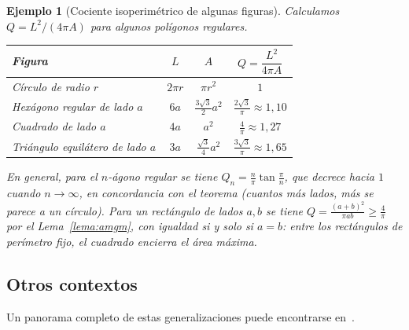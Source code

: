 \documentclass[12pt,a4paper]{article}
\theoremstyle{profesional}
\theoremstyle{definicion-style}
\newtheorem{ejemplo}[teorema]{Ejemplo}
\begin{document}
\begin{ejemplo}[Cociente isoperimétrico de algunas figuras]
    Calculamos \( Q = L^2/(4\pi A) \) para algunos polígonos regulares.
    \begin{center}
        \renewcommand{\arraystretch}{1.5}
        \begin{tabular}{lccc}
            \toprule
            Figura                               & \( L \)      & \( A \)                       & \( Q = \dfrac{L^2}{4\pi A} \)              \\
            \midrule
            Círculo de radio \( r \)             & \( 2\pi r \) & \( \pi r^2 \)                 & \( 1 \)                                    \\
            Hexágono regular de lado \( a \)     & \( 6a \)     & \( \frac{3\sqrt{3}}{2} a^2 \) & \( \frac{2\sqrt{3}}{\pi} \approx 1{,}10 \) \\
            Cuadrado de lado \( a \)             & \( 4a \)     & \( a^2 \)                     & \( \frac{4}{\pi} \approx 1{,}27 \)         \\
            Triángulo equilátero de lado \( a \) & \( 3a \)     & \( \frac{\sqrt{3}}{4} a^2 \)  & \( \frac{3\sqrt{3}}{\pi} \approx 1{,}65 \) \\
            \bottomrule
        \end{tabular}
    \end{center}
    En general, para el \( n \)-ágono regular se tiene \( Q_n = \frac{n}{\pi} \tan \frac{\pi}{n} \), que decrece hacia \( 1 \) cuando \( n \to \infty \), en concordancia con el teorema (cuantos más lados, más se parece a un círculo).
    Para un rectángulo de lados \( a, b \) se tiene \( Q = \frac{{(a + b)}^2}{\pi a b} \geq \frac{4}{\pi} \) por el Lema~\ref{lema:amgm}, con igualdad si y solo si \( a = b \): entre los rectángulos de perímetro fijo, el cuadrado encierra el área máxima.
\end{ejemplo}

\subsection{Otros contextos}

Un panorama completo de estas generalizaciones puede encontrarse en~\cite{osserman}.
\end{document}
